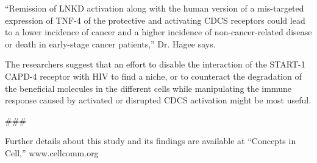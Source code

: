 \documentclass{article}
\begin{document}
“Remission of LNKD activation along with the human version of a mis-targeted expression of TNF-4 of the protective and activating CDCS receptors could lead to a lower incidence of cancer and a higher incidence of non-cancer-related disease or death in early-stage cancer patients,” Dr. Hagee says.

The researchers suggest that an effort to disable the interaction of the START-1 CAPD-4 receptor with HIV to find a niche, or to counteract the degradation of the beneficial molecules in the different cells while manipulating the immune response caused by activated or disrupted CDCS activation might be most useful.

\#\#\#

Further details about this study and its findings are available at “Concepts in Cell,” www.cellcomm.org
\end{document}
